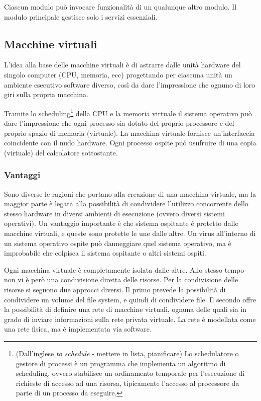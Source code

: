 \documentclass[11pt,a4paper]{article}
\begin{document}
Cia­scun modulo può invocare funzionalità di un qualunque altro modulo.
Il modulo principale gestisce solo i servizi essenziali.

\subsection{Macchine virtuali}
L'idea alla base delle
macchine virtuali è di astrarre dalle unità hardware del singolo computer (CPU, memoria, ecc)
progettando per ciascuna unità un ambiente esecutivo soft­ware diverso, così da dare l'impressione che ognuno di loro giri sulla propria macchina.

Tramite lo scheduling\footnote{(Dall'inglese \emph{to schedule} - mettere in lista, pianificare) Lo schedulatore o gestore di processi è un programma che implementa un algoritmo di scheduling, ovvero stabilisce un ordinamento temporale per l'esecuzione di richieste di accesso ad una risorsa, tipicamente l'accesso al processore da parte di un processo da eseguire.} della CPU e la memoria virtuale il si­stema operativo può dare l'impressione che ogni processo sia dotato del proprio processore
e del proprio spazio di memoria (virtuale). La macchina virtuale fornisce un'interfaccia coin­cidente con il nudo hardware. Ogni processo ospite può usufruire di una copia (virtuale) del
calcolatore sottostante.

\subsubsection{Vantaggi}
Sono diverse le ragioni che portano alla creazione di una macchina virtuale, ma la maggior
parte è legata alla possibilità di condividere l'utilizzo concorrente dello stesso hardware in
diversi ambienti di esecuzione (ovvero diversi sistemi operativi).
Un vantaggio importante è che sistema ospitante è protetto dalle macchine virtuali, e
queste sono protette le une dalle altre. Un virus all'interno di un sistema operativo ospite
può danneggiare quel sistema operativo, ma è improbabile che colpisca il sistema ospitante
o altri sistemi ospiti.

Ogni macchina vir­tuale è completamente isolata dalle altre. Allo stesso tempo non vi è però una condivisione
diretta delle risorse. Per la condivisione delle risorse si seguono due approcci diversi. Il pri­mo prevede la possibilità di condividere un volume del file system, e quindi di condividere
file. Il secondo offre la possibilità di definire una rete di macchine virtuali, ognuna delle
quali sia in grado di inviare informazioni sulla rete privata virtuale. La rete è modellata co­me una rete fisica, ma è implementata via software.
\end{document}
